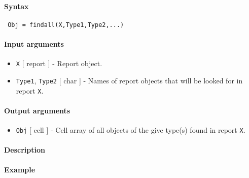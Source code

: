 


	\paragraph{Syntax}
 
 \begin{verbatim}
 Obj = findall(X,Type1,Type2,...)
 \end{verbatim}
 
 \paragraph{Input arguments}
 
 \begin{itemize}
 \item
   \texttt{X} {[} report {]} - Report object.
 \item
   \texttt{Type1}, \texttt{Type2} {[} char {]} - Names of report objects
   that will be looked for in report \texttt{X}.
 \end{itemize}
 
 \paragraph{Output arguments}
 
 \begin{itemize}
 \item
   \texttt{Obj} {[} cell {]} - Cell array of all objects of the give
   type(s) found in report \texttt{X}.
 \end{itemize}
 
 \paragraph{Description}
 
 \paragraph{Example}


